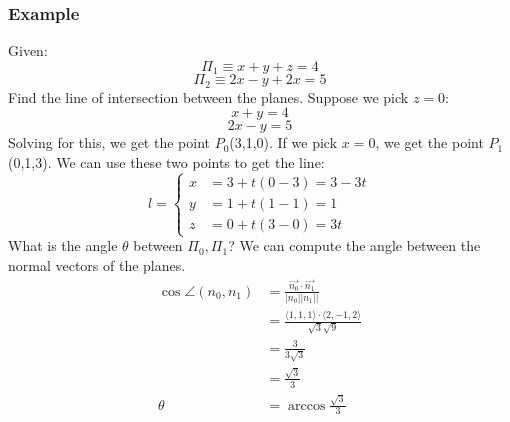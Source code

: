 \documentclass[letterpaper, 12pt]{math}
\begin{document}
\subsubsection*{Example}
Given:
\[ \Pi_1 \equiv x+y+z = 4 \]
\[ \Pi_2 \equiv 2x-y+2x = 5 \]
Find the line of intersection between the planes. Suppose we pick \( z = 0 \):
\[ x+y = 4 \]
\[ 2x-y = 5 \]
Solving for this, we get the point \( P_0 \)(3,1,0). If we pick \( x = 0 \), we
get the point \( P_1 \)(0,1,3). We can use these two points to get the line:
\[ l = \begin{cases}
  x &= 3+t(0-3) = 3-3t\\
  y &= 1+t(1-1) = 1 \\
  z &= 0+t(3-0) = 3t
\end{cases} \]
What is the angle \( \theta \) between \( \Pi_0,\Pi_1 \)? We can compute the
angle between the normal vectors of the planes.
\begin{align*}
  \cos\angle(n_0,n_1) &= \frac{\vec{n_0}\cdot\vec{n_1}}{|n_0||n_1||} \\
  &= \frac{\langle1,1,1\rangle\cdot\langle2,-1,2\rangle}{\sqrt{3}\sqrt{9}} \\
  &= \frac{3}{3\sqrt{3}} \\
  &= \frac{\sqrt{3}}{3} \\
  \theta &= \arccos\frac{\sqrt{3}}{3}
\end{align*}
\end{document}
